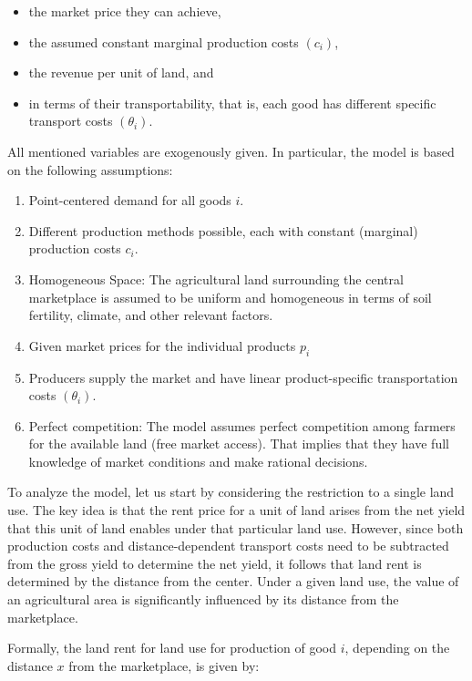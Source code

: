 \documentclass[
  12pt,
  oneside]{book}
\providecommand{\tightlist}{%
  \setlength{\itemsep}{0pt}\setlength{\parskip}{0pt}}
\theoremstyle{definition}
\theoremstyle{definition}
\theoremstyle{definition}
\theoremstyle{definition}
\theoremstyle{remark}
\begin{document}
\begin{itemize}
\tightlist
\item
  the market price they can achieve,
\item
  the assumed constant marginal production costs \((c_i)\),
\item
  the revenue per unit of land, and
\item
  in terms of their transportability, that is, each good has different specific transport costs \((\theta_i)\).
\end{itemize}

All mentioned variables are exogenously given. In particular, the model is based on the following assumptions:

\begin{enumerate}
\def\labelenumi{\arabic{enumi}.}
\tightlist
\item
  Point-centered demand for all goods \(i\).
\item
  Different production methods possible, each with constant (marginal) production costs \(c_i\).
\item
  Homogeneous Space: The agricultural land surrounding the central marketplace is assumed to be uniform and homogeneous in terms of soil fertility, climate, and other relevant factors.
\item
  Given market prices for the individual products \(p_i\)
\item
  Producers supply the market and have linear product-specific transportation costs \((\theta_i)\).
\item
  Perfect competition: The model assumes perfect competition among farmers for the available land (free market access). That implies that they have full knowledge of market conditions and make rational decisions.
\end{enumerate}

To analyze the model, let us start by considering the restriction to a single land use. The key idea is that the rent price for a unit of land arises from the net yield that this unit of land enables under that particular land use. However, since both production costs and distance-dependent transport costs need to be subtracted from the gross yield to determine the net yield, it follows that land rent is determined by the distance from the center. Under a given land use, the value of an agricultural area is significantly influenced by its distance from the marketplace.

Formally, the land rent for land use for production of good \(i\), depending on the distance \(x\) from the marketplace, is given by:
\end{document}
